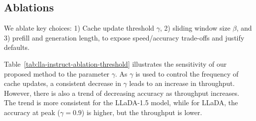 \documentclass{article} %
\theoremstyle{definition}
\theoremstyle{remark}
\begin{document}
\begin{table}[t]
\centering
\caption{Performance and Speedup Comparison of LLaDA-V on MathVista and MathVerse. Each benchmark presents results from LLaDA-V (base) using  Fast-dLLM, and our method.}
\label{tab:perf}
\vspace{-0.1in}
\vspace{-0.1in}


\end{table}


\vspace{-0.05in}
\subsection{Ablations}
\vspace{-0.05in}

We ablate key choices: 1) Cache update threshold $\gamma$, 2) sliding window size $\beta$, and 3) prefill and generation length, to expose speed/accuracy trade-offs and justify defaults.

 Table~\ref{tab:lla-instruct-ablation-threshold} illustrates the sensitivity of our proposed method to the parameter $\gamma$. As $\gamma$ is used to control the frequency of cache updates, a consistent decrease in $\gamma$ leads to an increase in throughput. However, there is also a trend of decreasing accuracy as throughput increases. The trend is more consistent for the LLaDA-1.5 model, while for LLaDA, the accuracy at peak ($\gamma=0.9$) is higher, but the throughput is lower.
\end{document}
